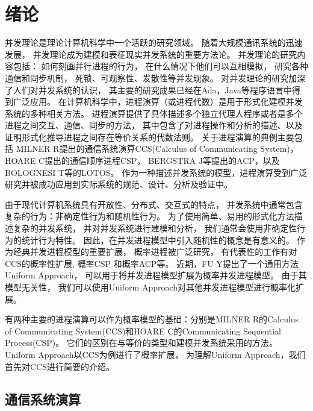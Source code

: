 
\chapter{绪论}\label{ch:intro}

并发理论是理论计算机科学中一个活跃的研究领域。
  随着大规模通讯系统的迅速发展，
  并发理论成为建模和表征现实并发系统的重要方法论。
  并发理论的研究内容包括：
  如何刻画并行进程的行为，
  在什么情况下他们可以互相模拟，
  研究各种通信和同步机制，
  死锁、可观察性、发散性等并发现象。
  对并发理论的研究加深了人们对并发系统的认识，
  其主要的研究成果已经在Ada，Java等程序语言中得到广泛应用\cite{计算机科学技术百科全书}。
  在计算机科学中，进程演算（或进程代数）是用于形式化建模并发系统的多种相关方法。
  进程演算提供了具体描述多个独立代理人程序或者是多个进程之间交互、通信、同步的方法，
  其中包含了对进程操作和分析的描述、以及证明形式化推导进程之间存在等价关系的代数法则\cite{History}。
  关于进程演算的典例主要包括
  MILNER R提出的通信系统演算CCS(Calculus of Communicating System)\cite{Milner_CCS}，
   HOARE C提出的通信顺序进程CSP\cite{Hoare_CSP}，
   BERGSTRA J等提出的ACP\cite{BERGSTRA_ACP}，以及BOLOGNESI T等的LOTOS\cite{LOTOS}。%
   作为一种描述并发系统的模型，进程演算受到广泛研究并被成功应用到实际系统的规范、设计、分析及验证中。

由于现代计算机系统具有开放性、分布式、交互式的特点，
并发系统中通常包含复杂的行为：非确定性行为和随机性行为。
为了使用简单、易用的形式化方法描述复杂的并发系统，
并对并发系统进行建模和分析，
我们通常会使用非确定性行为的统计行为特性。
因此，在并发进程模型中引入随机性的概念是有意义的。
作为经典并发进程模型的重要扩展，
概率进程被广泛研究，
有代表性的工作有对CCS的概率性扩展\cite{CCS_Prob_1,CCS_Prob_2},
概率CSP\cite{CSP_Prob} 和概率ACP\cite{ACP_Prob}等。
近期，FU Y提出了一个通用方法Uniform Approach\cite{Fu_UniformApproach}，
可以用于将并发进程模型扩展为概率并发进程模型。
由于其模型无关性，
我们可以使用Uniform Approach对其他并发进程模型进行概率化扩展。

有两种主要的进程演算可以作为概率模型的基础：分别是MILNER R的Calculus of Communicating System(CCS)\cite{Milner_CCS}和HOARE C的Communicating Sequential Process(CSP)\cite{Hoare_CSP}。
它们的区别在与等价的类型和建模并发系统采用的方法\cite{DIFF_CCS_CSP}。
Uniform Approach以CCS为例进行了概率扩展，
为理解Uniform Approach，我们首先对CCS进行简要的介绍。

\section{通信系统演算}

